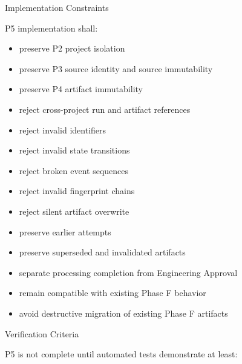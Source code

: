 Implementation Constraints

P5 implementation shall:

\begin{itemize}
\tightlist
\item
  preserve P2 project isolation
\item
  preserve P3 source identity and source immutability
\item
  preserve P4 artifact immutability
\item
  reject cross-project run and artifact references
\item
  reject invalid identifiers
\item
  reject invalid state transitions
\item
  reject broken event sequences
\item
  reject invalid fingerprint chains
\item
  reject silent artifact overwrite
\item
  preserve earlier attempts
\item
  preserve superseded and invalidated artifacts
\item
  separate processing completion from Engineering Approval
\item
  remain compatible with existing Phase F behavior
\item
  avoid destructive migration of existing Phase F artifacts
\end{itemize}

Verification Criteria

P5 is not complete until automated tests demonstrate at least:

